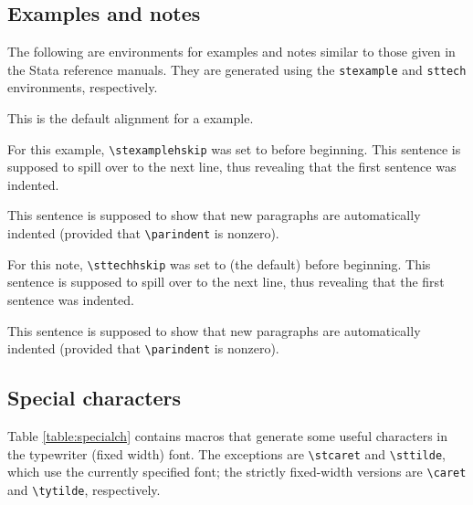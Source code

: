 \subsection{Examples and notes}

The following are environments for examples and notes similar to those
given in the Stata reference manuals.  They are generated using the
\texttt{stexample} and \texttt{sttech} environments, respectively.


\begin{stexample}
This is the default alignment for a \stata{} example.
\end{stexample}

\setlength{\stexamplehskip}{0pt}
\begin{stexample}
For this example, \verb+\stexamplehskip+ was set to
\texttt{\the\stexamplehskip}
before beginning.  This sentence is supposed to spill
over to the next line, thus revealing that the first sentence was indented.

This sentence is supposed to show that new paragraphs are automatically
indented (provided that \verb+\parindent+ is nonzero).
\end{stexample}

\begin{sttech}
For this note, \verb+\sttechhskip+ was set to \texttt{\the\sttechhskip}
(the default) before beginning.  This sentence is supposed to spill over to
the next line, thus revealing that the first sentence was indented.

This sentence is supposed to show that new paragraphs are automatically
indented (provided that \verb+\parindent+ is nonzero).
\end{sttech}

\subsection{Special characters}

Table \ref{table:specialch} contains macros that generate some useful
characters in the typewriter (fixed width) font.  The exceptions are
\verb+\stcaret+ and \verb+\sttilde+, which use the currently specified font;
the strictly fixed-width versions are \verb+\caret+ and \verb+\tytilde+,
respectively.

